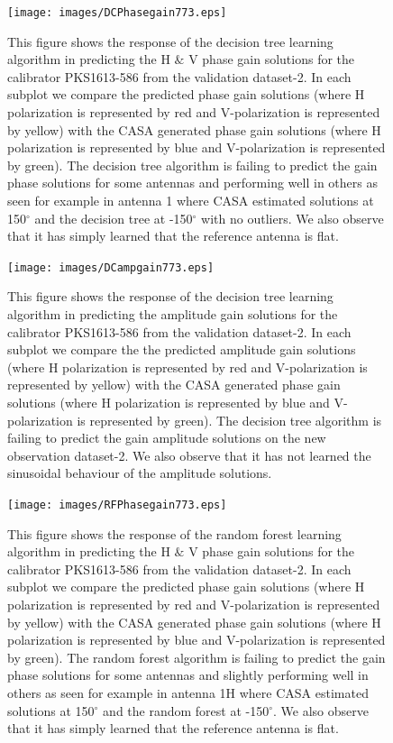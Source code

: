 \begin{figure}[H]
    \texttt{[image: images/DCPhasegain773.eps]}
    \caption{This figure shows the response of the decision tree learning algorithm in predicting the H $\&$ V phase gain solutions for the calibrator PKS1613-586 from the validation dataset-2. In each subplot we compare the predicted phase gain solutions (where H polarization is represented by red and V-polarization is represented by yellow) with the CASA generated phase gain solutions (where H polarization is represented by blue and V-polarization is represented by green). The decision tree algorithm is failing to predict the gain phase solutions for some antennas and performing well in others as seen for example in antenna 1 where CASA estimated solutions at 150$^\circ$ and the decision tree at -150$^\circ$ with no outliers. We also observe that it has simply learned that the reference antenna is flat.}
    \label{obs9}
\end{figure}

\begin{figure}[H]
    \texttt{[image: images/DCampgain773.eps]}
    \caption{This figure shows the response of the decision tree learning algorithm in predicting the amplitude gain solutions for the calibrator PKS1613-586 from the validation dataset-2. In each subplot we compare the the predicted amplitude gain solutions (where H polarization is represented by red and V-polarization is represented by yellow) with the CASA generated phase gain solutions (where H polarization is represented by blue and V-polarization is represented by green). The decision tree algorithm is failing to predict the gain amplitude solutions on the new observation dataset-2. We also observe that it has not learned the sinusoidal behaviour of the amplitude solutions.}
     \label{da3}
\end{figure}


\begin{figure}[H]
    \texttt{[image: images/RFPhasegain773.eps]}
    \caption{This figure shows the response of the random forest learning algorithm in predicting the H $\&$ V phase gain solutions for the calibrator PKS1613-586 from the validation dataset-2. In each subplot we compare the predicted phase gain solutions (where H polarization is represented by red and V-polarization is represented by yellow) with the CASA generated phase gain solutions (where H polarization is represented by blue and V-polarization is represented by green). The random forest algorithm is failing to predict the gain phase solutions for some antennas and slightly performing well in others as seen for example in antenna 1H where CASA estimated solutions at 150$^\circ$ and the random forest at -150$^\circ$.  We also observe that it has simply learned that the reference antenna is flat.}
    \label{obs10}
\end{figure}

